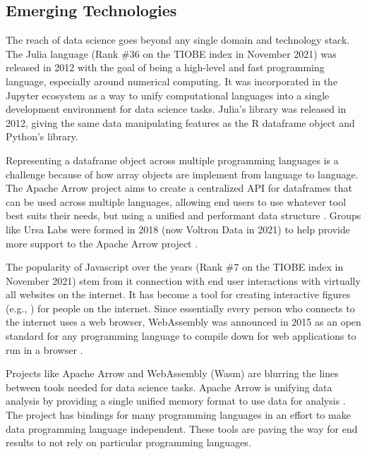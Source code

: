 \documentclass[010-intro.tex]{subfiles}
\begin{document}
\subsection{Emerging Technologies}

    The reach of data science goes beyond any single domain and technology stack.
    The Julia language (Rank \#36 on the TIOBE index in November 2021)
    was released in 2012 with the goal of being a high-level and fast programming language,
    especially around numerical computing.
    It was incorporated in the Jupyter ecosystem as a way to unify computational languages into a single
    development environment for data science tasks.
    Julia's  library was released in 2012, giving the same data manipulating
    features as the R dataframe object and Python's  library.

    Representing a dataframe object across multiple programming languages is a challenge because of
    how array objects are implement from language to language.
    The Apache Arrow project aims to create a centralized API for dataframes that can be used across multiple languages,
    allowing end users to use whatever tool best suits their needs,
    but using a unified and performant data structure
    \cite{ApacheArrow}.
    Groups like Ursa Labs were formed in 2018 (now Voltron Data in 2021) to help provide
    more support to the Apache Arrow project
    \cite{UrsaLabs, VoltronData}.

    The popularity of Javascript over the years (Rank \#7 on the TIOBE index in November 2021)
    stem from it connection with end user interactions with
    virtually all websites on the internet.
    It has become a tool for creating interactive figures (e.g., ) for people on the internet.
    Since essentially every person who connects to the internet uses a web browser,
    WebAssembly was announced in 2015 as an open standard for any programming language
    to compile down for web applications to run in a browser
    \cite{WebAssembly}.

    Projects like Apache Arrow and WebAssembly (Wasm) are blurring the lines between tools needed for data science tasks.
    Apache Arrow is unifying data analysis by providing a single unified memory format to use data for analysis
    \cite{theapachesoftwarefoundationApacheArrow2021}.
    The project has bindings for many programming languages in an effort to make data programming language independent.
    These tools are paving the way for end results to not rely on particular programming languages.
\end{document}
